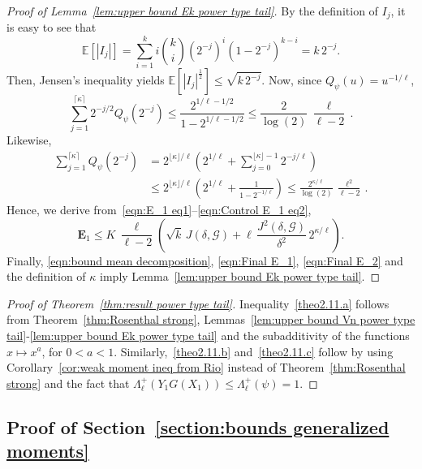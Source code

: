 \documentclass[10pt]{amsart}
\theoremstyle{definition}\newtheorem{defi}[theo]{Definition}\newtheorem{rema}[theo]{Remark}\newtheorem{exam}[theo]{Example}\newtheorem{exem}[theo]{Example}\newtheorem{nota}[theo]{Notation}
\newcommand{\bE}{\mathbb{E}}
\newcommand{\bfE}{\mathbf{E}}
\newcommand{\caG}{\mathscr{G}}
\begin{document}
\begin{proof}[Proof of Lemma~\ref{lem:upper bound Ek power type tail}]
By the definition of $I_j$, it is easy to see that
\[
\bE\left[|I_j|\right]=\sum_{i=1}^k i \binom{k}{i} (2^{-j})^i (1-2^{-j})^{k-i} = k\,2^{-j}.
\]
Then, Jensen's inequality yields $\bE[|I_j|^{\frac{1}{2}}]\leq \sqrt{k\,2^{-j}}$. Now, since $Q_\psi(u)=u^{-1/\ell}$,
\begin{equation}\label{eqn:Control E_1 eq1}
\sum_{j=1}^{\lceil\kappa\rceil} 2^{-j/2}Q_\psi(2^{-j}) \leq \frac{2^{1/\ell-1/2}}{1-2^{1/\ell-1/2}}\leq \frac{2}{\log(2)}\,\frac{\ell}{\ell-2}\,.
\end{equation}
Likewise,
\begin{equation}\label{eqn:Control E_1 eq2}
\begin{aligned}
\sum_{j=1}^{\lceil\kappa\rceil} Q_\psi(2^{-j}) &= 2^{\lfloor\kappa\rfloor /\ell}\left(2^{1/\ell}+\sum_{j=0}^{\lfloor\kappa\rfloor-1}2^{-j/\ell}\right)\\
&\leq 2^{\lfloor\kappa\rfloor /\ell}\left(2^{1/\ell}+\frac{1}{1-2^{-1/\ell}}\right)
\leq \frac{2^{\kappa/\ell}}{\log(2)}\,\frac{\ell^2}{\ell-2}\,.
\end{aligned}
\end{equation}
Hence, we derive from~\eqref{eqn:E_1 eq1}--\eqref{eqn:Control E_1 eq2},
\begin{equation}\label{eqn:Final E_1}
\bfE_1\leq K\,\frac{\ell}{\ell-2}\left(\sqrt{k}\,J(\delta,\caG) + \ell\,\frac{J^2(\delta,\caG)}{\delta^2}\,2^{\kappa/\ell}\right).
\end{equation}
Finally, \eqref{eqn:bound mean decomposition}, \eqref{eqn:Final E_1}, \eqref{eqn:Final E_2} and the definition of $\kappa$ imply Lemma~\ref{lem:upper bound Ek power type tail}.
\end{proof}

\begin{proof}[Proof of Theorem~\ref{thm:result power type tail}]
Inequality~\eqref{theo2.11.a} follows from Theorem~\ref{thm:Rosenthal strong}, Lemmas~\ref{lem:upper bound Vn power type tail}-\ref{lem:upper bound Ek power type tail} and the subadditivity of the functions $x\mapsto x^a$, for $0<a<1$. Similarly,~\eqref{theo2.11.b} and~\eqref{theo2.11.c} follow by using Corollary~\ref{cor:weak moment ineq from Rio} instead of Theorem~\ref{thm:Rosenthal strong} and the fact that $\Lambda_\ell^+(Y_1G(X_1))\leq\Lambda_\ell^+(\psi)=1$.
\end{proof}

\subsection{Proof of Section~\ref{section:bounds generalized moments}}
\end{document}
